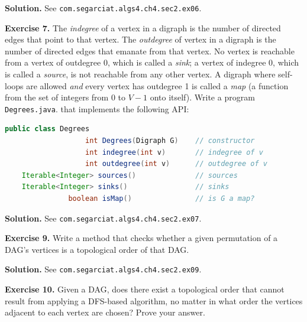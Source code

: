 \documentclass[12pt, a4paper]{article}
\newenvironment{ex}[2][Exercise]
{\par\medskip\noindent \textbf{#1 #2.}}
{\medskip}
\newenvironment{sol}[1][Solution]
{\par\medskip\noindent \textbf{#1.} }
{\medskip}
\begin{document}
	\begin{sol}
		See \texttt{com.segarciat.algs4.ch4.sec2.ex06}.
	\end{sol}
	\begin{ex}{7}
		The \emph{indegree} of a vertex in a digraph is the number of directed edges
		that point to that vertex. The \emph{outdegree} of vertex in a digraph is the
		number of directed edges that emanate from that vertex. No vertex is
		reachable from a vertex of outdegree 0, which is called a \emph{sink}; a
		vertex of indegree 0, which is called a \emph{source}, is not reachable from
		any other vertex. A digraph where self-loops are allowed \emph{and} every
		vertex has outdegree 1 is called a \emph{map} (a function from the set of
		integers from $0$ to $V-1$ onto itself). Write a program \texttt{Degrees.java}.
		that implements the following API:
		\begin{lstlisting}[language=java]
		  public class Degrees
	               int Degrees(Digraph G)    // constructor
	               int indegree(int v)       // indegree of v 
	               int outdegree(int v)      // outdegree of v
	Iterable<Integer> sources()              // sources
	Iterable<Integer> sinks()                // sinks
	           boolean isMap()               // is G a map?
		\end{lstlisting}
	\end{ex}
	\begin{sol}
		See \texttt{com.segarciat.algs4.ch4.sec2.ex07}.
	\end{sol}
	\begin{ex}{9}
		Write a method that checks whether a given permutation of a DAG's vertices
		is a topological order of that DAG.
	\end{ex}
		\begin{sol}
		See \texttt{com.segarciat.algs4.ch4.sec2.ex09}.
	\end{sol}
	\begin{ex}{10}
		Given a DAG, does there exist a topological order that cannot result from
		applying a DFS-based algorithm, no matter in what order the vertices adjacent
		to each vertex are chosen? Prove your answer.
	\end{ex}
\end{document}
